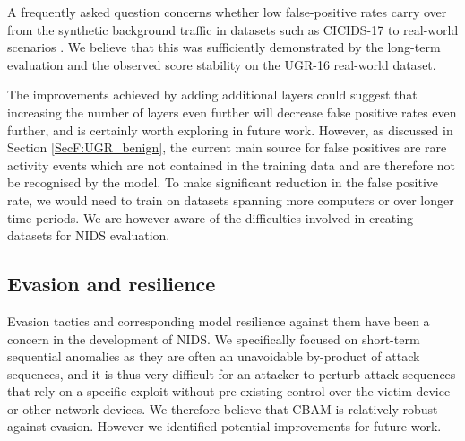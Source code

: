 A frequently asked question concerns whether low false-positive rates carry over from the synthetic background traffic in datasets such as CICIDS-17 to real-world scenarios \cite{sommer_outside_2010}. We believe that this was sufficiently demonstrated by the long-term evaluation and the observed score stability on the UGR-16 real-world dataset. 


The improvements achieved by adding additional layers could suggest that increasing the number of layers even further will decrease false positive rates even further, and is certainly worth exploring in future work. However, as discussed in Section \ref{SecF:UGR_benign}, the current main source for false positives are rare activity events which are not contained in the training data and are therefore not be recognised by the model. To make significant reduction in the false positive rate, we would need to train on datasets spanning more computers or over longer time periods. We are however aware of the difficulties involved in creating datasets for NIDS evaluation.

\subsection{Evasion and resilience}
Evasion tactics and corresponding model resilience against them have been a concern in the development of NIDS. We specifically focused on short-term sequential anomalies as they are often an unavoidable by-product of attack sequences, and it is thus very difficult for an attacker to perturb attack sequences that rely on a specific exploit without pre-existing control over the victim device or other network devices. %
We therefore believe that CBAM is relatively robust against evasion. However we identified potential improvements for future work.


